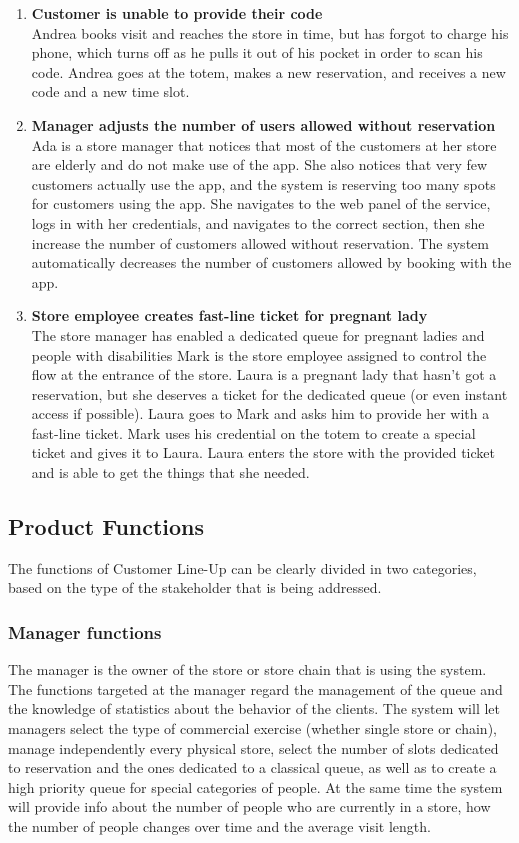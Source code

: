 \begin{enumerate}[label=\Alph*.]
        \item \textbf{Customer is unable to provide their code}\\
            Andrea books visit and reaches the store in time, but has forgot to charge his phone, which turns off as he pulls it out of his pocket in order to scan his code.
            Andrea goes at the totem, makes a new reservation, and receives a new code and a new time slot.
        \item \textbf{Manager adjusts the number of users allowed without reservation}\\
            Ada is a store manager that notices that most of the customers at her store are elderly and do not make use of the app. She also notices that very few
            customers actually use the app, and the system is reserving too many spots for customers using the app. She navigates to the web panel of the service,
            logs in with her credentials, and navigates to the correct section, then she increase the number of customers allowed without reservation. The system
            automatically decreases the number of customers allowed by booking with the app.
        \item \textbf{Store employee creates fast-line ticket for pregnant lady}\\
            The store manager has enabled a dedicated queue for pregnant ladies and people with disabilities
            Mark is the store employee assigned to control the flow at the entrance of the store. Laura is a pregnant lady that hasn't got a reservation, but she deserves a ticket for the dedicated queue (or even instant access if possible). Laura goes to Mark and asks him to provide her with a fast-line ticket. Mark uses his credential on the totem to create a special ticket and gives it to Laura. Laura enters the store with the provided ticket and is able to get the things that she needed.         
        \end{enumerate}
\subsection{Product Functions}
The functions of Customer Line-Up can be clearly divided in two categories, based on the type of the stakeholder that is being addressed.

\subsubsection{Manager functions}
The manager is the owner of the store or store chain that is using the system.
The functions targeted at the manager regard the management of the queue and the knowledge of statistics about the behavior of the clients.
The system will let managers select the type of commercial exercise (whether single store or chain), manage independently every physical store,
select the number of slots dedicated to reservation and the ones dedicated to a classical queue,
as well as to create a high priority queue for special categories of people.
At the same time the system will provide info about the number of people who are currently in a store,
how the number of people changes over time and the average visit length.

